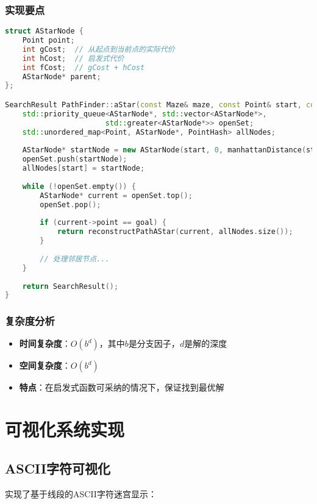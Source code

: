 \documentclass[UTF8]{ctexart}
\begin{document}
\subsubsection{实现要点}
\begin{lstlisting}[language=C++]
struct AStarNode {
    Point point;
    int gCost;  // 从起点到当前点的实际代价
    int hCost;  // 启发式代价
    int fCost;  // gCost + hCost
    AStarNode* parent;
};

SearchResult PathFinder::aStar(const Maze& maze, const Point& start, const Point& goal) {
    std::priority_queue<AStarNode*, std::vector<AStarNode*>, 
                       std::greater<AStarNode*>> openSet;
    std::unordered_map<Point, AStarNode*, PointHash> allNodes;
    
    AStarNode* startNode = new AStarNode(start, 0, manhattanDistance(start, goal));
    openSet.push(startNode);
    allNodes[start] = startNode;
    
    while (!openSet.empty()) {
        AStarNode* current = openSet.top();
        openSet.pop();
        
        if (current->point == goal) {
            return reconstructPathAStar(current, allNodes.size());
        }
        
        // 处理邻居节点...
    }
    
    return SearchResult();
}
\end{lstlisting}

\subsubsection{复杂度分析}
\begin{itemize}
    \item \textbf{时间复杂度}：$O(b^d)$，其中$b$是分支因子，$d$是解的深度
    \item \textbf{空间复杂度}：$O(b^d)$
    \item \textbf{特点}：在启发式函数可采纳的情况下，保证找到最优解
\end{itemize}

\section{可视化系统实现}

\subsection{ASCII字符可视化}

实现了基于线段的ASCII字符迷宫显示：
\end{document}
